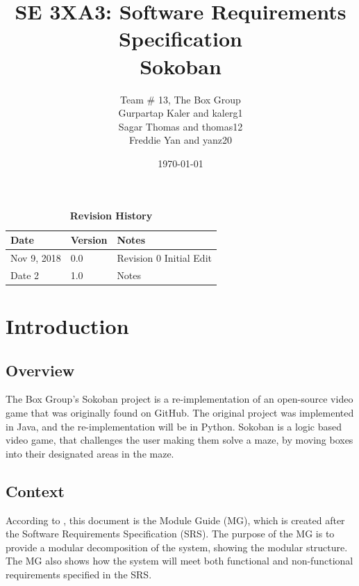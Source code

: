 \documentclass[12pt, titlepage]{article}
\title{SE 3XA3: Software Requirements Specification\\Sokoban}
\author{Team \# 13, The Box Group
		\\ Gurpartap Kaler and kalerg1
		\\ Sagar Thomas and thomas12
		\\ Freddie Yan and yanz20
}
\date{\today}
\begin{document}
\maketitle

\tableofcontents
\listoftables
\listoffigures

\begin{table}[bp]
\caption{\bf Revision History}
\begin{tabularx}{\textwidth}{p{3cm}p{2cm}X}
\toprule {\bf Date} & {\bf Version} & {\bf Notes}\\
\midrule
Nov 9, 2018 & 0.0 & Revision 0 Initial Edit \\
Date 2 & 1.0 & Notes\\
\bottomrule
\end{tabularx}
\end{table}

\newpage


\section{Introduction}

\subsection{Overview}
The Box Group's Sokoban project is a re-implementation of an open-source video game that was originally found on GitHub. The original project was implemented in Java, and the re-implementation will be in Python. Sokoban is a logic based video game, that challenges the user making them solve a maze, by moving boxes into their designated areas in the maze.

\subsection{Context}
According to \citet{Parnas1978}, this document is the Module Guide (MG), which is created after the Software Requirements Specification (SRS). The purpose of the MG is to provide a modular decomposition of the system, showing the modular structure. The MG also shows how the system will meet both functional and non-functional requirements specified in the SRS. 
\end{document}

